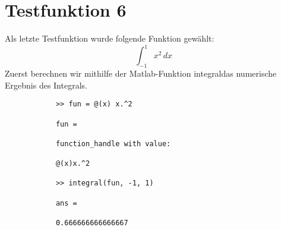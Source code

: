 \documentclass[11pt,titlepage]{article}
\begin{document}
	\section{Testfunktion 6}
		Als letzte Testfunktion wurde folgende Funktion gewählt:
		\begin{displaymath}
			\int_{-1}^1  x^2 \, dx\
		\end{displaymath}
		Zuerst berechnen wir mithilfe der Matlab-Funktion \glqq integral\grqq das numerische Ergebnis des Integrals.
		\begin{lstlisting}
			>> fun = @(x) x.^2
			
			fun =
			
			function_handle with value:
			
			@(x)x.^2
			
			>> integral(fun, -1, 1)
			
			ans =
			
			0.666666666666667
		\end{lstlisting}
			
\end{document}
